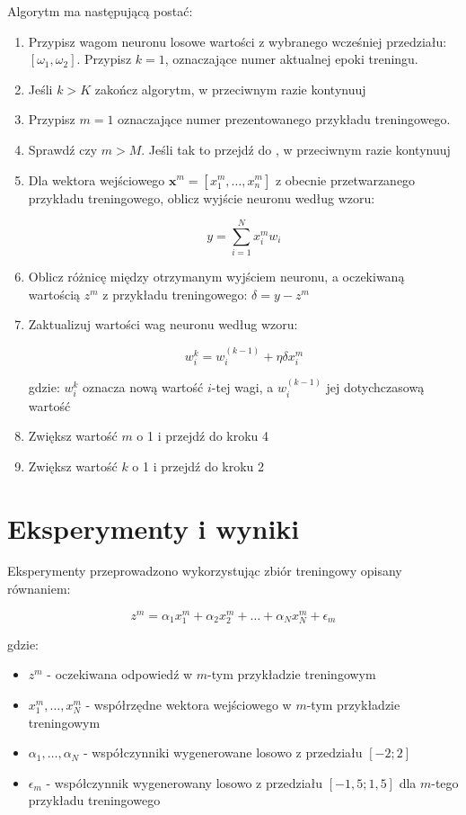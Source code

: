 \documentclass[12pt]{article}
\begin{document}
Algorytm ma następującą postać:

\begin{enumerate}
\item Przypisz wagom neuronu losowe wartości z wybranego wcześniej przedziału: $[\omega_1, \omega_2]$. Przypisz $k=1$, oznaczające numer aktualnej epoki treningu.
\item Jeśli $k > K$ zakończ algorytm, w przeciwnym razie kontynuuj
\item Przypisz $m=1$ oznaczające numer prezentowanego przykładu treningowego.
\item Sprawdź czy $m > M$. Jeśli tak to przejdź do , w przeciwnym razie kontynuuj
\item Dla wektora wejściowego $\textbf{x}^m = [x^m_1, \ldots , x^m_n]$ z obecnie przetwarzanego przykładu treningowego, oblicz wyjście neuronu według wzoru:

\[ y = \sum_{i=1}^N x^m_i w_i \]

\item Oblicz różnicę między otrzymanym wyjściem neuronu, a oczekiwaną wartością $z^m$ z przykładu treningowego: $\delta = y - z^m$

\item Zaktualizuj wartości wag neuronu według wzoru:

\[ w_i^k = w_i^{(k-1)} + \eta  \delta x^m_i \]

gdzie: $w_i^k$ oznacza nową wartość $i$-tej wagi, a $w_i^{(k - 1)}$ jej dotychczasową wartość

\item Zwiększ wartość $m$ o 1 i przejdź do kroku 4
\item Zwiększ wartość $k$ o 1 i przejdź do kroku 2 

\end{enumerate}

\section{Eksperymenty i wyniki}

Eksperymenty przeprowadzono wykorzystując zbiór treningowy opisany równaniem:

\[ z^m = \alpha_1 x^m_1 + \alpha_2 x^m_2 + \ldots + \alpha_N x^m_N + \epsilon_m \]

gdzie: 

\begin{itemize}
\item $z^m$ - oczekiwana odpowiedź w $m$-tym przykładzie treningowym
\item $x^m_1,\ldots, x^m_N$ - współrzędne wektora wejściowego w $m$-tym przykładzie treningowym
\item $\alpha_1, \ldots, \alpha_N$ - współczynniki wygenerowane losowo z przedziału $[-2; 2]$
\item $\epsilon_m$ - współczynnik wygenerowany losowo z przedziału $[-1,5; 1,5]$ dla $m$-tego przykładu treningowego
\end{itemize}
\end{document}

